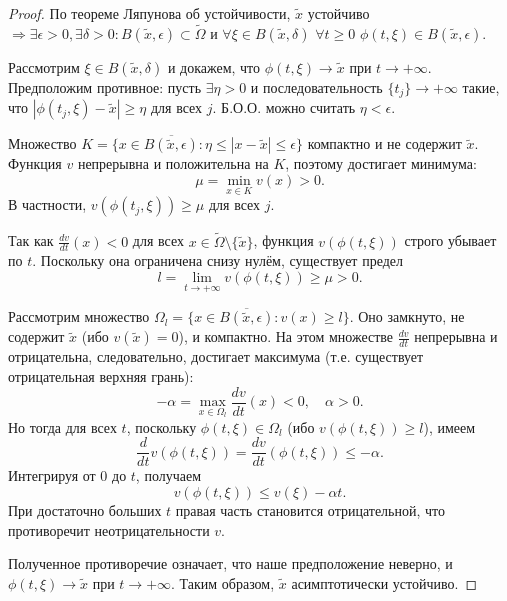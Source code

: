 \begin{proof}
    По теореме Ляпунова об устойчивости, \(\tilde{x}\) устойчиво \(\Rightarrow \exists \epsilon > 0, \exists \delta > 0: B(\tilde{x}, \epsilon) \subset \widetilde{\Omega}\) и \(\forall \xi \in B(\tilde{x}, \delta)\) \(\forall t \ge 0\) \(\phi(t, \xi) \in B(\tilde{x}, \epsilon)\). 
    
    Рассмотрим \(\xi \in B(\tilde{x}, \delta)\) и докажем, что \(\phi(t, \xi) \to \tilde{x}\) при \(t \to +\infty\). Предположим противное: пусть \(\exists \eta > 0\) и последовательность \(\{t_j\} \to +\infty\) такие, что \(|\phi(t_j, \xi) - \tilde{x}| \ge \eta\) для всех \(j\). Б.О.О. можно считать \(\eta < \epsilon\). 
    
    Множество \(K = \{x \in \overline{B(\tilde{x}, \epsilon)} : \eta \le |x - \tilde{x}| \le \epsilon\}\) компактно и не содержит \(\tilde{x}\). Функция \(v\) непрерывна и положительна на \(K\), поэтому достигает минимума:
    \[
    \mu = \min_{x \in K} v(x) > 0.
    \]
    В частности, \(v(\phi(t_j, \xi)) \ge \mu\) для всех \(j\).
    
    Так как \(\frac{dv}{dt}(x) < 0\) для всех \(x \in \widetilde{\Omega} \setminus \{\tilde{x}\}\), функция \(v(\phi(t, \xi))\) строго убывает по \(t\). Поскольку она ограничена снизу нулём, существует предел
    \[
    l = \lim_{t \to +\infty} v(\phi(t, \xi)) \ge \mu > 0.
    \]
    
    Рассмотрим множество \(\Omega_l = \{x \in \overline{B(\tilde{x}, \epsilon)} : v(x) \ge l\}\). Оно замкнуто, не содержит \(\tilde{x}\) (ибо \(v(\tilde{x}) = 0\)), и компактно. На этом множестве \(\frac{dv}{dt}\) непрерывна и отрицательна, следовательно, достигает максимума (т.е. существует отрицательная верхняя грань):
    \[
    -\alpha = \max_{x \in \Omega_l} \frac{dv}{dt}(x) < 0, \quad \alpha > 0.
    \]
    Но тогда для всех \(t\), поскольку \(\phi(t, \xi) \in \Omega_l\) (ибо \(v(\phi(t, \xi)) \ge l\)), имеем
    \[
    \frac{d}{dt} v(\phi(t, \xi)) = \frac{dv}{dt}(\phi(t, \xi)) \le -\alpha.
    \]
    Интегрируя от \(0\) до \(t\), получаем
    \[
    v(\phi(t, \xi)) \le v(\xi) - \alpha t.
    \]
    При достаточно больших \(t\) правая часть становится отрицательной, что противоречит неотрицательности \(v\). 
    
    Полученное противоречие означает, что наше предположение неверно, и \(\phi(t, \xi) \to \tilde{x}\) при \(t \to +\infty\). Таким образом, \(\tilde{x}\) асимптотически устойчиво.
\end{proof}

